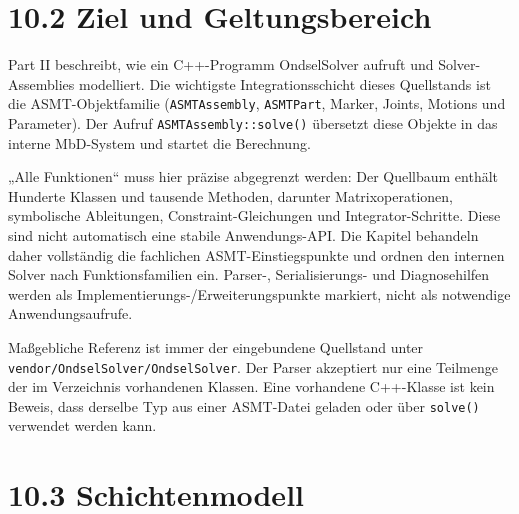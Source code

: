\documentclass[
  12pt
]{book}
\begin{document}
\hypertarget{ziel-und-geltungsbereich}{%
\section{\texorpdfstring{{10.2} Ziel und
Geltungsbereich}{10.2 Ziel und Geltungsbereich}}\label{ziel-und-geltungsbereich}}

Part II beschreibt, wie ein C++-Programm OndselSolver aufruft und
Solver-Assemblies modelliert. Die wichtigste Integrationsschicht dieses
Quellstands ist die ASMT-Objektfamilie (\texttt{ASMTAssembly},
\texttt{ASMTPart}, Marker, Joints, Motions und Parameter). Der Aufruf
\texttt{ASMTAssembly::solve()} übersetzt diese Objekte in das interne
MbD-System und startet die Berechnung.

„Alle Funktionen`` muss hier präzise abgegrenzt werden: Der Quellbaum
enthält Hunderte Klassen und tausende Methoden, darunter
Matrixoperationen, symbolische Ableitungen, Constraint-Gleichungen und
Integrator-Schritte. Diese sind nicht automatisch eine stabile
Anwendungs-API. Die Kapitel behandeln daher vollständig die fachlichen
ASMT-Einstiegspunkte und ordnen den internen Solver nach
Funktionsfamilien ein. Parser-, Serialisierungs- und Diagnosehilfen
werden als Implementierungs-/Erweiterungspunkte markiert, nicht als
notwendige Anwendungsaufrufe.

Maßgebliche Referenz ist immer der eingebundene Quellstand unter
\texttt{vendor/OndselSolver/OndselSolver}. Der Parser akzeptiert nur
eine Teilmenge der im Verzeichnis vorhandenen Klassen. Eine vorhandene
C++-Klasse ist kein Beweis, dass derselbe Typ aus einer ASMT-Datei
geladen oder über \texttt{solve()} verwendet werden kann.

\hypertarget{schichtenmodell}{%
\section{\texorpdfstring{{10.3}
Schichtenmodell}{10.3 Schichtenmodell}}\label{schichtenmodell}}
\end{document}
